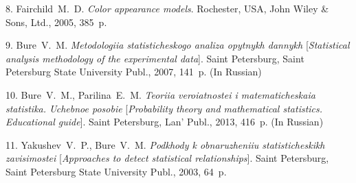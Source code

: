 {8. {Fairchild~M.~D. } {\it Color appearance models}. Rochester,
USA, John Wiley \& Sons, Ltd., 2005, 385~p.

9. {Bure~V.~M.} {\it Metodologiia statisticheskogo analiza
opytnykh dannykh} [{\it Statistical analysis methodology of the
experimental data}]. Saint Petersburg, Saint Petersburg State
University Publ., 2007, 141~p. (In Russian)

10. {Bure~V.~M., Parilina~E.~M. } {\it Teoriia veroiatnostei i
matematicheskaia statistika. Uchebnoe posobie} [{\it Probability
theory and mathematical statistics. Educational guide}]. Saint
Petersburg, Lan' Publ., 2013, 416~p. (In Russian)

11. {Yakushev~V.~P., Bure~V.~M.} {\it Podkhody k obnaruzheniiu
statisticheskikh zavisimostei} [{\it Approaches to detect
statistical relationships}]. Saint Petersburg, Saint Petersburg
State University Publ., 2003, 64~p.



}
